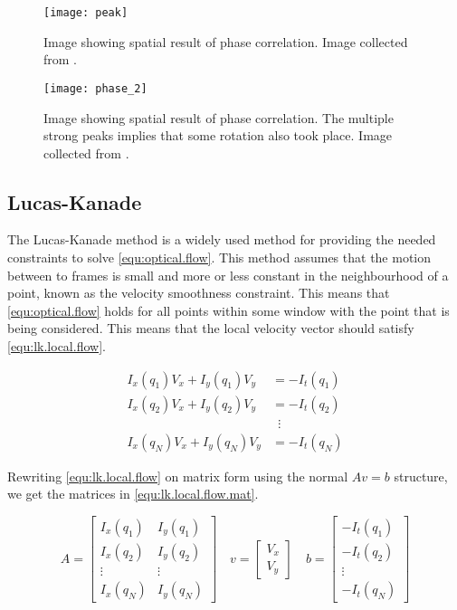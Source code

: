 \begin{figure}
	\centering
	\texttt{[image: peak]}
	\caption{Image showing spatial result of phase correlation. Image collected from \citet{ee368}.}
	\label{fig:phase_1}
\end{figure}

\begin{figure}
	\centering
	\texttt{[image: phase\_2]}
	\caption{Image showing spatial result of phase correlation. The multiple strong peaks implies that 
		some rotation also took place. Image collected from \citet{ee368}.}
	\label{fig:phase_2}
\end{figure}

\subsection{Lucas-Kanade}\label{sec:lukas-kanade}
The Lucas-Kanade method is a widely used method for providing the needed constraints to solve \eqref{equ:optical.flow}. This method assumes that 
the motion between to frames is small and more or less constant in the neighbourhood of a point, known as the velocity smoothness constraint. 
This means that \eqref{equ:optical.flow} holds for all points within some window
with the point that is being considered. This means that the local velocity vector should satisfy \eqref{equ:lk.local.flow}.

\begin{equation}\label{equ:lk.local.flow}
	\begin{split}
		I_x(q_1)V_x + I_y(q_1)V_y	&= -I_t(q_1) \\
		I_x(q_2)V_x + I_y(q_2)V_y 	&= -I_t(q_2) \\
		& \,\,\, \vdots \\
		I_x(q_N)V_x + I_y(q_N)V_y 	&= -I_t(q_N)
	\end{split}
\end{equation}

Rewriting \eqref{equ:lk.local.flow} on matrix form using the normal $Av = b$ structure, we get the matrices in \eqref{equ:lk.local.flow.mat}.

\begin{equation} \label{equ:lk.local.flow.mat}
A = \begin{bmatrix}
		I_x(q_1) 	& I_y(q_1) \\
		I_x(q_2) 	& I_y(q_2) \\ 
		\vdots 		& \vdots \\
		I_x(q_N)	& I_y(q_N)
	\end{bmatrix} \quad 
v =	\begin{bmatrix}
		V_x \\ V_y
	\end{bmatrix} \quad
b = \begin{bmatrix}
		-I_t(q_1) \\ -I_t(q_2) \\ \vdots \\ -I_t(q_N)
	\end{bmatrix}
\end{equation}


